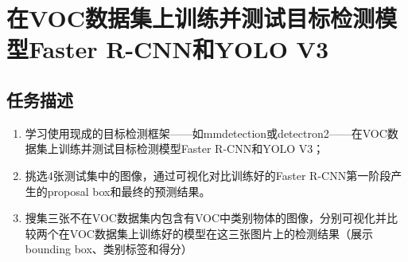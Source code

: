 \documentclass[notitlepage,cs4size,punct,oneside]{ctexrep}
\numberwithin{equation}{chapter}
\theoremstyle{mystyle}
\begin{document}
\chapter{在VOC数据集上训练并测试目标检测模型Faster R-CNN和YOLO V3}
\section{任务描述}
\begin{enumerate}
    \item 学习使用现成的目标检测框架——如mmdetection或detectron2——在VOC数据集上训练并测试目标检测模型Faster R-CNN和YOLO V3；
    \item 挑选4张测试集中的图像，通过可视化对比训练好的Faster R-CNN第一阶段产生的proposal box和最终的预测结果。
    \item 搜集三张不在VOC数据集内包含有VOC中类别物体的图像，分别可视化并比较两个在VOC数据集上训练好的模型在这三张图片上的检测结果（展示bounding box、类别标签和得分）
\end{enumerate}
\end{document}
